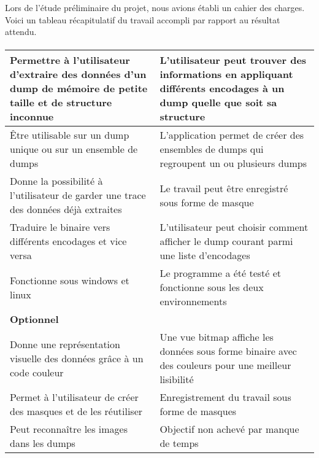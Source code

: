 Lors de l'étude préliminaire du projet, nous avions établi un cahier des charges. Voici un tableau récapitulatif du travail accompli par rapport au résultat attendu.
\paragraph{}

\begin{tabular}{|p{6cm}|p{6cm}|}
  \hline
  Permettre à l'utilisateur d'extraire des données d'un dump de mémoire de petite taille et de structure inconnue &
  L'utilisateur peut trouver des informations en appliquant différents encodages à un dump quelle que soit sa structure
  \\ \hline
  Être utilisable sur un dump unique ou sur un ensemble de dumps &
  L'application permet de créer des ensembles de dumps qui regroupent un ou plusieurs dumps
  \\ \hline
  Donne la possibilité à l'utilisateur de garder une trace des données déjà extraites &
  Le travail peut être enregistré sous forme de masque
  \\ \hline
  Traduire le binaire vers différents encodages et vice versa &
  L'utilisateur peut choisir comment afficher le dump courant parmi une liste d'encodages
  \\ \hline
  Fonctionne sous windows et linux &
  Le programme a été testé et fonctionne sous les deux environnements
  \\ \hline \hline
  \textbf{Optionnel} &
  \\ \hline
  Donne une représentation visuelle des données grâce à un code couleur &
  Une vue bitmap affiche les données sous forme binaire avec des couleurs pour une meilleur lisibilité
  \\ \hline
  Permet à l'utilisateur de créer des masques et de les réutiliser &
  Enregistrement du travail sous forme de masques
  \\ \hline
  Peut reconnaître les images dans les dumps &
  Objectif non achevé par manque de temps
  \\ \hline
\end{tabular}

